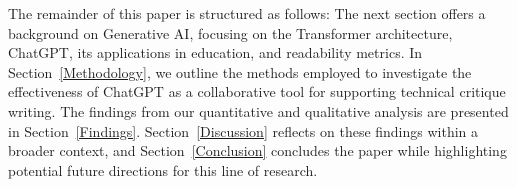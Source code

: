 The remainder of this paper is structured as follows: The next section offers a background on Generative AI, focusing on the Transformer architecture, ChatGPT, its applications in education, and readability metrics. In Section~\ref{Methodology}, we outline the methods employed to investigate the effectiveness of ChatGPT as a collaborative tool for supporting technical critique writing. The findings from our quantitative and qualitative analysis are presented in Section~\ref{Findings}. Section~\ref{Discussion} reflects on these findings within a broader context, and Section~\ref{Conclusion} concludes the paper while highlighting potential future directions for this line of research.
